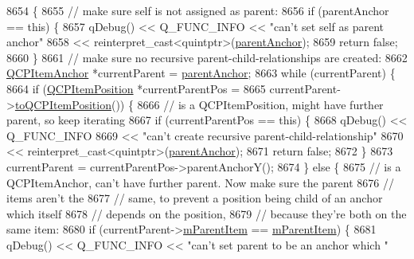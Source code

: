 \begin{DoxyCode}
8654                                                                \{
8655   \textcolor{comment}{// make sure self is not assigned as parent:}
8656   \textcolor{keywordflow}{if} (parentAnchor == \textcolor{keyword}{this}) \{
8657     qDebug() << Q\_FUNC\_INFO << \textcolor{stringliteral}{"can't set self as parent anchor"}
8658              << \textcolor{keyword}{reinterpret\_cast<}quintptr\textcolor{keyword}{>}(\hyperlink{class_q_c_p_item_position_a7b4ffab9946945c0e11cd2352dc2e042}{parentAnchor});
8659     \textcolor{keywordflow}{return} \textcolor{keyword}{false};
8660   \}
8661   \textcolor{comment}{// make sure no recursive parent-child-relationships are created:}
8662   \hyperlink{class_q_c_p_item_anchor}{QCPItemAnchor} *currentParent = \hyperlink{class_q_c_p_item_position_a7b4ffab9946945c0e11cd2352dc2e042}{parentAnchor};
8663   \textcolor{keywordflow}{while} (currentParent) \{
8664     \textcolor{keywordflow}{if} (\hyperlink{class_q_c_p_item_position}{QCPItemPosition} *currentParentPos =
8665             currentParent->\hyperlink{class_q_c_p_item_anchor_ac54b20120669950255a63587193dbb86}{toQCPItemPosition}()) \{
8666       \textcolor{comment}{// is a QCPItemPosition, might have further parent, so keep iterating}
8667       \textcolor{keywordflow}{if} (currentParentPos == \textcolor{keyword}{this}) \{
8668         qDebug() << Q\_FUNC\_INFO
8669                  << \textcolor{stringliteral}{"can't create recursive parent-child-relationship"}
8670                  << \textcolor{keyword}{reinterpret\_cast<}quintptr\textcolor{keyword}{>}(\hyperlink{class_q_c_p_item_position_a7b4ffab9946945c0e11cd2352dc2e042}{parentAnchor});
8671         \textcolor{keywordflow}{return} \textcolor{keyword}{false};
8672       \}
8673       currentParent = currentParentPos->parentAnchorY();
8674     \} \textcolor{keywordflow}{else} \{
8675       \textcolor{comment}{// is a QCPItemAnchor, can't have further parent. Now make sure the parent}
8676       \textcolor{comment}{// items aren't the}
8677       \textcolor{comment}{// same, to prevent a position being child of an anchor which itself}
8678       \textcolor{comment}{// depends on the position,}
8679       \textcolor{comment}{// because they're both on the same item:}
8680       \textcolor{keywordflow}{if} (currentParent->\hyperlink{class_q_c_p_item_anchor_a80fad480ad3bb980446ed6ebc00818ae}{mParentItem} == \hyperlink{class_q_c_p_item_anchor_a80fad480ad3bb980446ed6ebc00818ae}{mParentItem}) \{
8681         qDebug() << Q\_FUNC\_INFO << \textcolor{stringliteral}{"can't set parent to be an anchor which "}

\end{DoxyCode}
